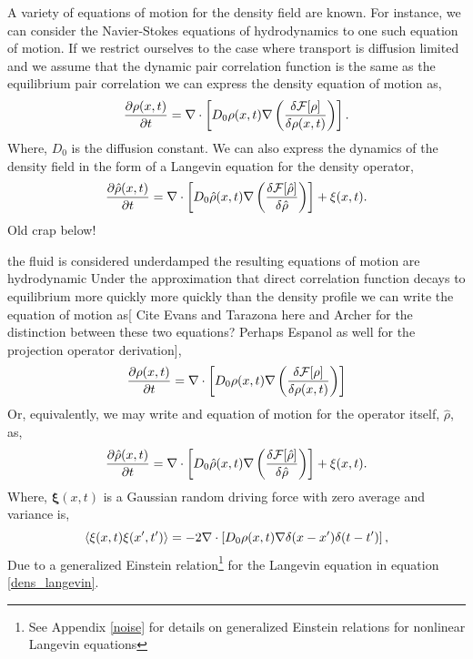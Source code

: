 A variety of equations of motion for the density field are known.
For instance, we can consider the Navier-Stokes equations of hydrodynamics to
one such equation of motion. If we restrict ourselves to the case where
transport is diffusion limited and we assume that the dynamic pair correlation
function is the same as the equilibrium pair correlation we can express the
density equation of motion as,
%
\begin{equation}
    \frac{\partial \rho(x, t)}{\partial t} = 
        \nabla \cdot \left[
            D_0 \rho(x, t) \nabla \left(\frac{\delta \mathcal{F}[\rho]}{\delta \rho(x, t)}\right)
        \right].
\end{equation}
%
Where, $D_0$ is the diffusion constant. We can also express the dynamics of
the density field in the form of a Langevin equation for the density operator,
%
\begin{equation}
    \label{dens_langevin}
    \frac{\partial \hat{\rho}(x, t)}{\partial t} =
        \nabla \cdot \left[
            D_0 \hat{\rho}(x, t) \nabla \left(\frac{\delta \mathcal{F}[\hat{\rho}]}{\delta \hat{\rho}}\right)
        \right] + \xi(x, t).
\end{equation}
%
{\color{ForestGreen} Old crap below!}


the fluid is considered underdamped the resulting equations of motion are
hydrodynamic Under the approximation that direct correlation function decays to
equilibrium more quickly more quickly than the density profile we can write the
equation of motion as[{\color{ForestGreen} Cite Evans and Tarazona here and
Archer for the distinction between these two equations? Perhaps Espanol as well
for the projection operator derivation}],
%
\begin{equation}
    \frac{\partial \rho(x, t)}{\partial t} = 
        \nabla \cdot \left[
            D_0 \rho(x, t) \nabla \left(\frac{\delta \mathcal{F}[\rho]}{\delta \rho(x, t)}\right)
        \right]
\end{equation}
%
Or, equivalently, we may write and equation of motion for the operator itself,
$\hat{\rho}$, as,
%
\begin{equation}
    \label{dens_langevin}
    \frac{\partial \hat{\rho}(x, t)}{\partial t} =
        \nabla \cdot \left[
            D_0 \hat{\rho}(x, t) \nabla \left(\frac{\delta \mathcal{F}[\hat{\rho}]}{\delta \hat{\rho}}\right)
        \right] + \xi(x, t).
\end{equation}
%
Where, $\mathbf{\xi}(x, t)$ is a Gaussian random driving force with zero
average and variance is,
%
\begin{equation}
    \left\langle \xi(x, t)\xi(x^\prime, t^\prime) \right\rangle = -2 \nabla \cdot \left[ D_0 \rho(x,t) 
        \nabla \delta(x - x^\prime) \delta(t - t^\prime)
    \right],
\end{equation}
%
Due to a generalized Einstein relation\footnote{See Appendix \ref{noise} for
details on generalized Einstein relations for nonlinear Langevin equations} for
the Langevin equation in equation \ref{dens_langevin}.

